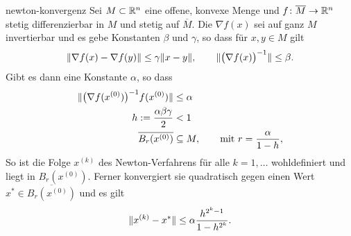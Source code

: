 \begin{Satz}{newton-konvergenz}
  Sei $M\subset \mathbb R^n$ eine offene, konvexe Menge und
  $f\colon \overline{M} \to \mathbb R^n$ stetig differenzierbar in $M$ und
  stetig auf $\overline{M}$. Die  $\nabla f(x)$
  sei auf ganz $M$ invertierbar und es gebe Konstanten $\beta$ und
  $\gamma$, so dass für $x,y\in M$ gilt
  \begin{gather}
    \label{eq:newton:2}
    \lVert\nabla f(x) - \nabla f(y)\rVert \le \gamma \lVert x-y\rVert,
    \qquad \lVert\bigl(\nabla f(x)\bigr)^{-1}\rVert \le \beta.
  \end{gather}
  Gibt es dann eine Konstante $\alpha$, so dass
  \begin{align}
    \label{eq:newton:3}
    \lVert\bigl(\nabla f(x^{(0)})\bigr)^{-1} f(x^{(0)})\rVert
    &\le \alpha\\
    h := \frac{\alpha\beta\gamma}2 &<1\\
    \overline{B_r(x^{(0)})} &\subseteq M, \qquad\text{mit } r=\frac{\alpha}{1-h},
  \end{align}
  So ist die Folge $x^{(k)}$ des Newton-Verfahrens für alle
  $k=1,\dots$ wohldefiniert und liegt in $B_r(x^{(0)})$. Ferner
  konvergiert sie quadratisch gegen einen Wert
  $x^*\in\overline{B_r(x^{(0)})}$ und es gilt
  \begin{gather}
    \label{eq:newton:4}
    \lVert x^{(k)}-x^*\rVert \le \alpha\frac{h^{2^k-1}}{1-h^{2^k}}.
  \end{gather}
\end{Satz}

